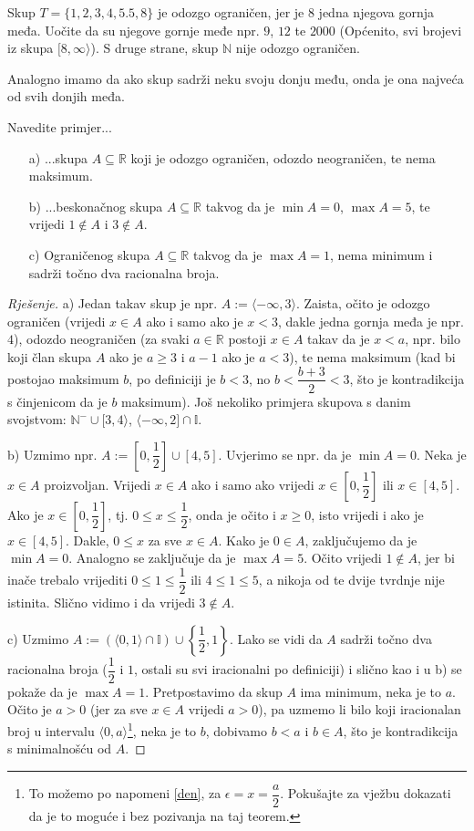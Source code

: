 \begin{exmp}
Skup $T=\{1, 2, 3, 4, 5.5, 8\}$ je odozgo ograničen, jer je $8$ jedna njegova gornja međa. Uočite da su njegove gornje međe npr. $9$, $12$ te $2000$ (Općenito, svi brojevi iz skupa $[8,\infty\rangle$). S druge strane, skup $\mathbb{N}$ nije odozgo ograničen. 

Analogno imamo da ako skup sadrži neku svoju donju među, onda je ona najveća od svih donjih međa.
\end{exmp}
\begin{exercise} Navedite primjer...
\begin{itemize}
\item[a)] ...skupa $A\subseteq \mathbb{R}$ koji je odozgo ograničen, odozdo neograničen, te nema maksimum.
\item[b)] ...beskonačnog skupa $A\subseteq \mathbb{R}$ takvog da je $\min{A}=0$, $\max{A}=5$, te vrijedi $1\notin A$ i $3\notin A$.
\item[c)] Ograničenog skupa $A\subseteq \mathbb{R}$ takvog da je $\max{A}=1$, nema minimum i sadrži točno dva racionalna broja.
\end{itemize}
\end{exercise}
\begin{proof}[Rješenje]
a) Jedan takav skup je npr. $A:=\langle -\infty, 3\rangle$. Zaista, očito je odozgo ograničen (vrijedi $x\in A$ ako i samo ako je $x<3$, dakle jedna gornja međa je npr. $4$), odozdo neograničen (za svaki $a\in \mathbb{R}$ postoji $x\in A$ takav da je $x<a$, npr. bilo koji član skupa $A$ ako je $a\geq 3$ i $a-1$ ako je $a<3$), te nema maksimum (kad bi postojao maksimum $b$, po definiciji je $b<3$, no $b<\dfrac{b+3}{2}<3$, što je kontradikcija s činjenicom da je $b$ maksimum). Još nekoliko primjera skupova s danim svojstvom: $\mathbb{N}^-\cup [3, 4\rangle$, $\langle -\infty, 2]\cap \mathbb{I}$.

b) Uzmimo npr. $A:=\left[0,\dfrac{1}{2}\right]\cup \left[4, 5\right]$. Uvjerimo se npr. da je $\min{A}=0$. Neka je $x\in A$ proizvoljan. Vrijedi $x\in A$ ako i samo ako vrijedi $x\in \left[0,\dfrac{1}{2}\right]$ ili $x\in [4, 5]$. Ako je $x\in \left[0,\dfrac{1}{2}\right]$, tj. $0\leq x\leq \dfrac{1}{2}$, onda je očito i $x\geq 0$, isto vrijedi i ako je $x\in [4, 5]$. Dakle, $0\leq x$ za sve $x\in A$. Kako je $0\in A$, zaključujemo da je $\min{A}=0$. Analogno se zaključuje da je $\max{A}=5$. Očito vrijedi $1\notin A$, jer bi inače trebalo vrijediti $0\leq 1\leq \dfrac{1}{2}$ ili $4\leq 1\leq 5$, a nikoja od te dvije tvrdnje nije istinita. Slično vidimo i da vrijedi $3\notin A$.

c) Uzmimo $A:=\left(\langle 0, 1\rangle\cap \mathbb{I}\right)\cup \left\{\dfrac{1}{2}, 1\right\}$. Lako se vidi da $A$ sadrži točno dva racionalna broja ($\dfrac{1}{2}$ i $1$, ostali su svi iracionalni po definiciji) i slično kao i u b) se pokaže da je $\max{A}=1$. Pretpostavimo da skup $A$ ima minimum, neka je to $a$. Očito je $a>0$ (jer za sve $x\in A$ vrijedi $a>0$), pa uzmemo li bilo koji iracionalan broj u intervalu $\langle 0, a\rangle$\footnote{To možemo po napomeni \ref{den}, za $\epsilon=x=\dfrac{a}{2}$. Pokušajte za vježbu dokazati da je to moguće i bez pozivanja na taj teorem.}, neka je to $b$, dobivamo $b<a$ i $b\in A$, što je kontradikcija s minimalnošću od $A$.
\end{proof}
